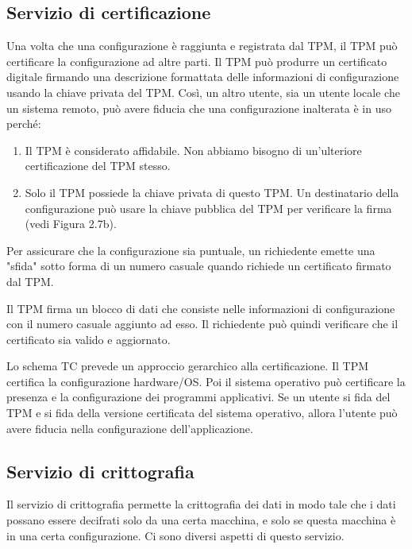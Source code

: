 \subsection{Servizio di certificazione}
Una volta che una configurazione è raggiunta e registrata dal TPM, il TPM può certificare la configurazione ad altre parti. Il TPM può produrre un certificato digitale firmando una descrizione formattata delle informazioni di configurazione usando la chiave privata del TPM. Così, un altro utente, sia un utente locale che un sistema remoto, può avere fiducia che una configurazione inalterata è in uso perché:

\begin{enumerate}
    \item Il TPM è considerato affidabile. Non abbiamo bisogno di un'ulteriore certificazione del TPM stesso.
    
    \item Solo il TPM possiede la chiave privata di questo TPM. Un destinatario della configurazione può usare la chiave pubblica del TPM per verificare la firma (vedi Figura 2.7b).
\end{enumerate}
Per assicurare che la configurazione sia puntuale, un richiedente emette una "sfida" sotto forma di un numero casuale quando richiede un certificato firmato dal TPM.

\singlespacing

Il TPM firma un blocco di dati che consiste nelle informazioni di configurazione con il numero casuale aggiunto ad esso. Il richiedente può quindi verificare che il certificato sia valido e aggiornato.

\singlespacing

Lo schema TC prevede un approccio gerarchico alla certificazione. Il TPM certifica la configurazione hardware/OS. Poi il sistema operativo può certificare la presenza e la configurazione dei programmi applicativi. Se un utente si fida del TPM e si fida della versione certificata del sistema operativo, allora l'utente può avere fiducia nella configurazione dell'applicazione.
\subsection{Servizio di crittografia}
Il servizio di crittografia permette la crittografia dei dati in modo tale che i dati possano essere decifrati solo da una certa macchina, e solo se questa macchina è in una certa configurazione. Ci sono diversi aspetti di questo servizio.

